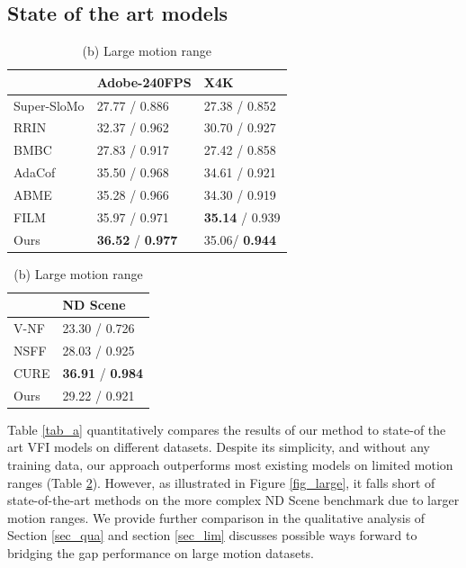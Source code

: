 \documentclass{article}
\begin{document}
\subsection{State of the art models}
\label{sec_sota}

\begin{table}[!hb]
    \caption{Quantitative comparison to state-of-the-art VFI on Standard benchmarks. Results are formatted as PSNR / SSMI.}
    \begin{minipage}{.5\linewidth}
      \centering
      \caption*{(a) Limited motion range}
      \begin{tabular}[t]{l | l | l }
       &  Adobe-240FPS &  X4K  \\
      \hline
      Super-SloMo \citep{jiang2018super} &  27.77 / 0.886 & 27.38 / 0.852  \\
      RRIN \cite{li2020video}  & 32.37 / 0.962 & 30.70 / 0.927  \\
      BMBC \citep{park2020bmbc}  & 27.83 / 0.917 & 27.42 / 0.858   \\
      AdaCof \cite{lee2020adacof} & 35.50 / 0.968 & 34.61 / 0.921 \\
      ABME   \cite{park2021asymmetric} & 35.28 / 0.966 & 34.30 / 0.919 \\
      FILM   \cite{reda2022film} &	35.97 / 0.971 & \textbf{35.14} / 0.939 \\
      Ours	& \textbf{36.52} / \textbf{0.977} & 35.06/ \textbf{0.944} \\
      \end{tabular}
    \label{tab_a}  
    \end{minipage}%
    \begin{minipage}{.5\linewidth}
      \centering
      \caption*{(b) Large motion range}
        \begin{tabular}[t]{l | l }
        	    &   ND Scene  \\
        \hline
        V-NF \cite{mildenhall2020nerf}   &  23.30 / 0.726 \\
        NSFF \cite{li2021neural}   & 28.03 / 0.925 \\
        CURE \cite{shangguan2022learning}   & \textbf{36.91} / \textbf{0.984} \\
        Ours	     & 29.22 / 0.921
        \end{tabular}
	\label{tab_b}
    \end{minipage}

\end{table}

Table \ref{tab_a} quantitatively compares the results of our method to state-of the art VFI models on different datasets.
Despite its simplicity, and without any training data, our approach outperforms most existing models on limited motion ranges (Table \ref{tab_b}).
However, as illustrated in Figure \ref{fig_large}, it falls short of state-of-the-art methods on the more complex ND Scene benchmark due to larger motion ranges.
We provide further comparison in the qualitative analysis of Section \ref{sec_qua} and section \ref{sec_lim} 
discusses possible ways forward to bridging the gap performance on large motion datasets.
\end{document}
